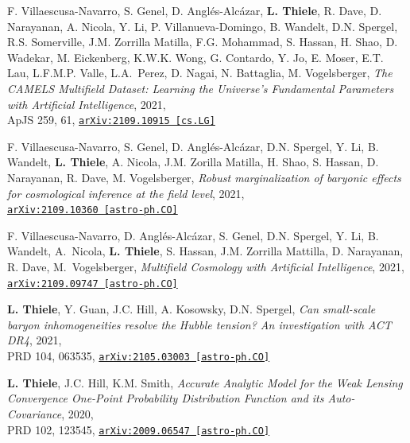 \begin{minipage}{\textwidth}
F. Villaescusa-Navarro, S. Genel, D. Angl\'es-Alc\'azar, {\bf L. Thiele},
R. Dave, D. Narayanan, A. Nicola, Y. Li, P. Villanueva-Domingo, B. Wandelt,
D.N. Spergel, R.S. Somerville, J.M. Zorrilla Matilla, F.G. Mohammad, S. Hassan,
H. Shao, D. Wadekar, M. Eickenberg, K.W.K. Wong, G. Contardo, Y. Jo, E. Moser,
E.T. Lau, L.F.M.P. Valle, L.A.~Perez, D. Nagai, N. Battaglia, M. Vogelsberger,
\emph{The CAMELS Multifield Dataset: Learning the Universe's Fundamental
      Parameters with Artificial Intelligence}, 2021,\\
ApJS 259, 61,
\href{https://arxiv.org/abs/2109.10915}{\mbox{\texttt{arXiv:2109.10915 [cs.LG]}}}
\end{minipage}

\begin{minipage}{\textwidth}
F. Villaescusa-Navarro, S. Genel, D. Angl\'es-Alc\'azar, D.N. Spergel, Y. Li,
B. Wandelt, {\bf L. Thiele}, A. Nicola, J.M. Zorilla Matilla, H. Shao,
S. Hassan, D. Narayanan, R. Dave, M. Vogelsberger,
\emph{Robust marginalization of baryonic effects for cosmological inference
      at the field level}, 2021,\\
\href{https://arxiv.org/abs/2109.10360}{\mbox{\texttt{arXiv:2109.10360 [astro-ph.CO]}}}
\end{minipage}

\begin{minipage}{\textwidth}
F. Villaescusa-Navarro, D. Angl\'es-Alc\'azar, S. Genel, D.N. Spergel, Y. Li,
B. Wandelt, A.~Nicola, {\bf L. Thiele}, S. Hassan, J.M. Zorrilla Mattilla,
D. Narayanan, R. Dave, M.~Vogelsberger,
\emph{Multifield Cosmology with Artificial Intelligence}, 2021,\\
\href{https://arxiv.org/abs/2109.09747}{\mbox{\texttt{arXiv:2109.09747 [astro-ph.CO]}}}
\end{minipage}

\begin{minipage}{\textwidth}
{\bf L. Thiele}, Y. Guan, J.C. Hill, A. Kosowsky, D.N. Spergel,
\emph{Can small-scale baryon inhomogeneities resolve the Hubble tension?
      An investigation with ACT DR4}, 2021,\\
PRD 104, 063535,
\href{https://arxiv.org/abs/2105.03003}{\mbox{\texttt{arXiv:2105.03003 [astro-ph.CO]}}}
\end{minipage}

\begin{minipage}{\textwidth}
{\bf L. Thiele}, J.C. Hill, K.M. Smith,
\emph{Accurate Analytic Model for the Weak Lensing Convergence One-Point Probability
      Distribution Function and its Auto-Covariance}, 2020,\\
PRD 102, 123545,
\href{https://arxiv.org/abs/2009.06547}{\mbox{\texttt{arXiv:2009.06547 [astro-ph.CO]}}}
\end{minipage}

